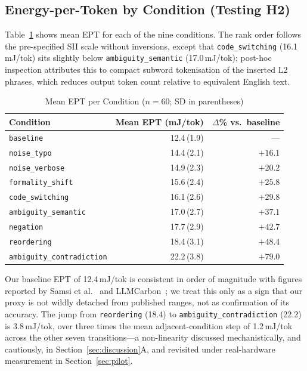 \documentclass[conference]{IEEEtran}
\begin{document}
\subsection{Energy-per-Token by Condition (Testing H2)}
Table~\ref{tab:ept} shows mean EPT for each of the nine conditions.
The rank order follows the pre-specified SII scale without inversions,
except that \texttt{code\_switching} (16.1\,mJ/tok) sits slightly
below \texttt{ambiguity\_semantic} (17.0\,mJ/tok); post-hoc inspection
attributes this to compact subword tokenisation of the inserted L2
phrases, which reduces output token count relative to equivalent
English text.
\begin{table}[t]
\caption{Mean EPT per Condition ($n = 60$; SD in parentheses)}
\label{tab:ept}
\centering
\setlength{\tabcolsep}{3.5pt}
\begin{tabular}{@{}lrr@{}}
\toprule
\textbf{Condition} & \textbf{Mean EPT (mJ/tok)} &
  \textbf{$\Delta$\% vs.\ baseline} \\
\midrule
\texttt{baseline}                  & 12.4\,(1.9) & --- \\
\texttt{noise\_typo}               & 14.4\,(2.1) & $+16.1$ \\
\texttt{noise\_verbose}            & 14.9\,(2.3) & $+20.2$ \\
\texttt{formality\_shift}          & 15.6\,(2.4) & $+25.8$ \\
\texttt{code\_switching}           & 16.1\,(2.6) & $+29.8$ \\
\texttt{ambiguity\_semantic}       & 17.0\,(2.7) & $+37.1$ \\
\texttt{negation}                  & 17.7\,(2.9) & $+42.7$ \\
\texttt{reordering}                & 18.4\,(3.1) & $+48.4$ \\
\texttt{ambiguity\_contradiction}  & 22.2\,(3.8) & $+79.0$ \\
\bottomrule
\end{tabular}
\end{table}
Our baseline EPT of 12.4\,mJ/tok is consistent in order of magnitude
with figures reported by Samsi et al.~\cite{samsi2023words} and
LLMCarbon~\cite{faiz2024llmcarbon}; we treat this only as a sign that
our proxy is not wildly detached from published ranges, not as
confirmation of its accuracy. The jump from \texttt{reordering}
(18.4) to \texttt{ambiguity\_contradiction} (22.2) is 3.8\,mJ/tok,
over three times the mean adjacent-condition step of 1.2\,mJ/tok
across the other seven transitions---a non-linearity discussed
mechanistically, and cautiously, in Section~\ref{sec:discussion}A, and
revisited under real-hardware measurement in Section~\ref{sec:pilot}.
\end{document}
